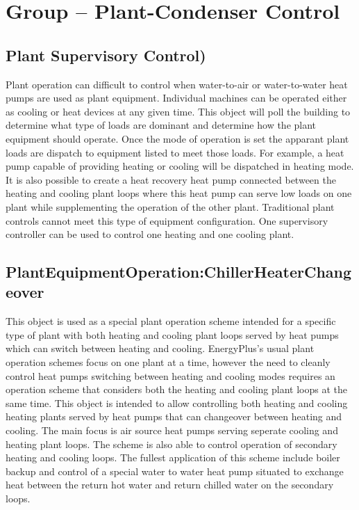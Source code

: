 \section{Group -- Plant-Condenser Control}\label{group-plant-condenser-control}

\subsection{Plant Supervisory Control)}\label{operation-schemes-plant-supervisory-control}

Plant operation can difficult to control when water-to-air or water-to-water heat pumps are used as plant equipment.  Individual machines can be operated either as cooling or heat devices at any given time.  This object will poll the building to determine what type of loads are dominant and determine how the plant equipment should operate. Once the mode of operation is set the apparant plant loads are dispatch to equipment listed to meet those loads. For example, a heat pump capable of providing heating or cooling will be dispatched in heating mode. It is also possible to create a heat recovery heat pump connected between the heating and cooling plant loops where this heat pump can serve low loads on one plant while supplementing the operation of the other plant. Traditional plant controls cannot meet this type of equipment configuration. One supervisory controller can be used to control one heating and one cooling plant.

\subsection{PlantEquipmentOperation:ChillerHeaterChangeover}\label{plantequipmentoperationchillerheaterchangeover}

This object is used as a special plant operation scheme intended for a specific type of plant with both heating and cooling plant loops served by heat pumps which can switch between heating and cooling.  EnergyPlus's usual plant operation schemes focus on one plant at a time, however the need to cleanly control heat pumps switching between heating and cooling modes requires an operation scheme that considers both the heating and cooling plant loops at the same time.  This object is intended to allow controlling both heating and cooling heating plants served by heat pumps that can changeover between heating and cooling.  The main focus is air source heat pumps serving seperate cooling and heating plant loops.  The scheme is also able to control operation of secondary heating and cooling loops.  The fullest application of this scheme include boiler backup and control of a special water to water heat pump situated to exchange heat between the return hot water and return chilled water on the secondary loops.  

